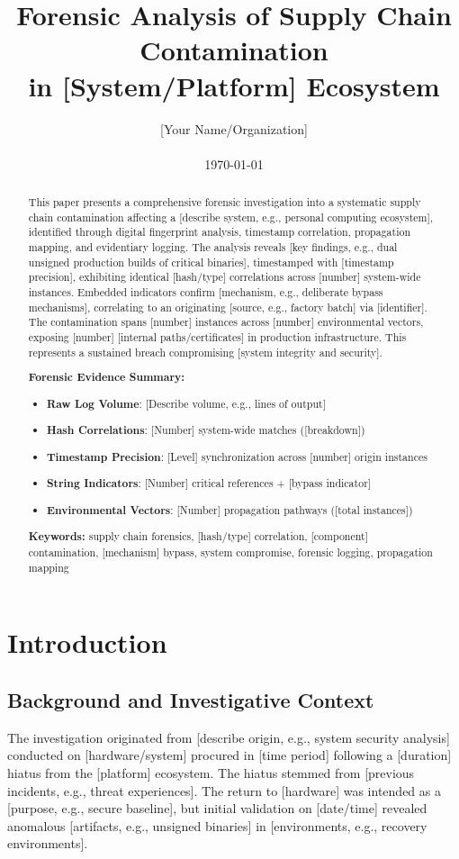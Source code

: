 \documentclass[12pt,a4paper]{article}
\title{\Huge Forensic Analysis of Supply Chain Contamination \\
\Large in [System/Platform] Ecosystem}
\author{[Your Name/Organization] \\
[Location] \\
\today}
\date{}
\begin{document}
\maketitle

\begin{abstract}
This paper presents a comprehensive forensic investigation into a systematic supply chain contamination affecting a [describe system, e.g., personal computing ecosystem], identified through digital fingerprint analysis, timestamp correlation, propagation mapping, and evidentiary logging. The analysis reveals [key findings, e.g., dual unsigned production builds of critical binaries], timestamped with [timestamp precision], exhibiting identical [hash/type] correlations across [number] system-wide instances. Embedded indicators confirm [mechanism, e.g., deliberate bypass mechanisms], correlating to an originating [source, e.g., factory batch] via [identifier]. The contamination spans [number] instances across [number] environmental vectors, exposing [number] [internal paths/certificates] in production infrastructure. This represents a sustained breach compromising [system integrity and security].

\textbf{Forensic Evidence Summary:}
\begin{itemize}
    \item \textbf{Raw Log Volume}: [Describe volume, e.g., lines of output]
    \item \textbf{Hash Correlations}: [Number] system-wide matches ([breakdown])
    \item \textbf{Timestamp Precision}: [Level] synchronization across [number] origin instances
    \item \textbf{String Indicators}: [Number] critical references + [bypass indicator]
    \item \textbf{Environmental Vectors}: [Number] propagation pathways ([total instances])
\end{itemize}

\textbf{Keywords:} supply chain forensics, [hash/type] correlation, [component] contamination, [mechanism] bypass, system compromise, forensic logging, propagation mapping
\end{abstract}

\newpage

\section{Introduction}

\subsection{Background and Investigative Context}
The investigation originated from [describe origin, e.g., system security analysis] conducted on [hardware/system] procured in [time period] following a [duration] hiatus from the [platform] ecosystem. The hiatus stemmed from [previous incidents, e.g., threat experiences]. The return to [hardware] was intended as a [purpose, e.g., secure baseline], but initial validation on [date/time] revealed anomalous [artifacts, e.g., unsigned binaries] in [environments, e.g., recovery environments].
\end{document}
